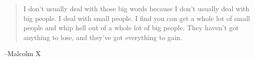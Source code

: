 \documentclass[letterpaper, landscape]{exam}
\begin{document}
  \else
    \vspace{11 cm}
    \begin{quote}
      \begin{em}
        I don't usually deal with those big words because I don't usually deal
        with big people. I deal with small people. I find you can get a whole
        lot of small people and whip hell out of a whole lot of big people.
        They haven't got anything to lose, and they've got everything to gain.
      \end{em}
    \end{quote}
    \hspace{1 cm}--Malcolm X
  \fi
\end{document}

